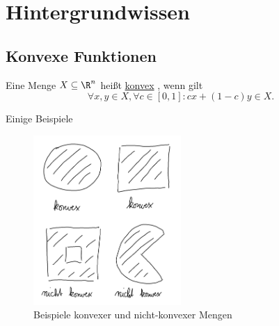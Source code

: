 \chapter{Hintergrundwissen}%
\label{cha:Hintergrundwissen}

\section{Konvexe Funktionen}%
\label{sec:Konvexe Funktionen}

\begin{definition}
\label{thm:konvexmenge}
	Eine Menge $X \subseteq \R^{n}$ heißt \underline{konvex} , wenn gilt
	\[
		\forall x,y \in X, \forall c \in [0,1] \colon 
		cx + (1-c)y \in X
	.\] 
\end{definition}

\begin{beispiel}
\label{thm:bspkonvexmenge}
Einige Beispiele

\begin{figure}[ht!]
	\begin{center}
		\includegraphics[width=0.5\textwidth]{pics/2.png}
	\end{center}
	\caption{Beispiele konvexer und nicht-konvexer Mengen}
	\label{fig:konvexemengen}
\end{figure}

\end{beispiel}

